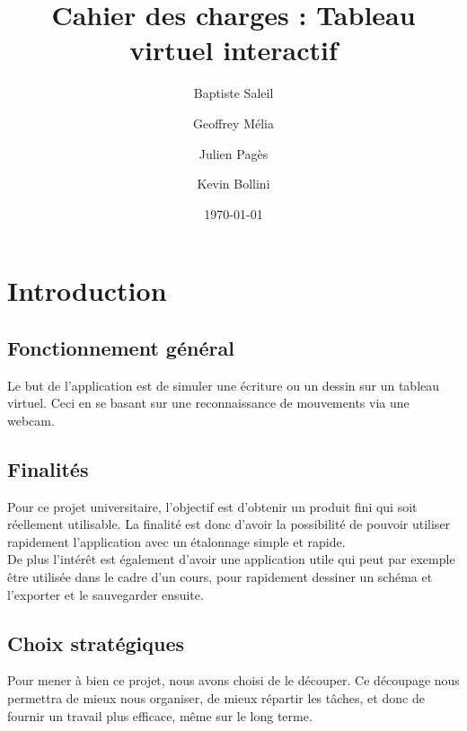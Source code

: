 \documentclass{article}
\title{Cahier des charges : Tableau virtuel interactif}
\author{Baptiste Saleil \and Geoffrey Mélia \and Julien Pagès \and Kevin Bollini}
\date{\today}
\begin{document}
	\maketitle
	\thispagestyle{empty}
	\newpage
	
	\tableofcontents
	\newpage
	
	\section{Introduction}
		\subsection{Fonctionnement général}
			Le but de l'application est de simuler une écriture ou un dessin sur un tableau virtuel. Ceci en se basant 
		sur une reconnaissance de mouvements via une webcam.
		\subsection{Finalités}
			Pour ce projet universitaire, l'objectif est d'obtenir un produit fini qui soit réellement utilisable.
La finalité est donc d'avoir la possibilité de pouvoir utiliser rapidement l'application avec un étalonnage simple et rapide.\\
De plus l'intérêt est également d'avoir une application utile qui peut par exemple être utilisée dans le cadre d'un cours,
pour rapidement dessiner un schéma et l'exporter et le sauvegarder ensuite. \\
\subsection{Choix stratégiques}
			Pour mener à bien ce projet, nous avons choisi de le découper.
			Ce découpage nous permettra de mieux nous organiser, de mieux répartir les tâches, et donc de fournir un travail plus efficace, même sur le long terme.
\end{document}
